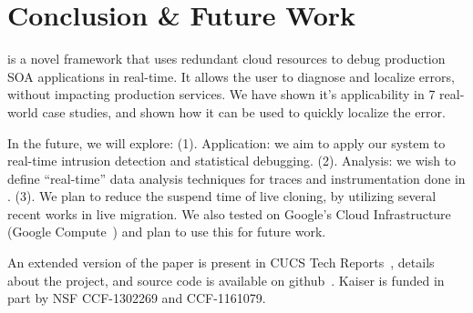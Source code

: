 
\vspace{-1mm}
\section{Conclusion \& Future Work}
\label{sec:conclusion}


\parikshan is a novel framework that uses redundant cloud resources to debug production SOA applications in real-time.
It allows the user to diagnose and localize errors, without impacting production services.
We have shown it's applicability in  7 real-world case studies, and shown how it can be used to quickly localize the error.

In the future, we will explore: (1). Application: we aim to apply our system to real-time intrusion detection and statistical debugging.
(2). Analysis: we wish to define ``real-time'' data analysis techniques for traces and instrumentation done in \parikshan.
(3). We plan to reduce the suspend time of live cloning, by utilizing several recent works in live migration.
We also tested \parikshan on Google's Cloud Infrastructure (Google Compute~\cite{gcompute}) and plan to use this for future work. 

An extended version of the paper is present in CUCS Tech Reports~\cite{parikshanTR,parikshanQueue}, details about the project, and source code is available on github~\cite{github}. 
Kaiser is funded in part by NSF CCF-1302269 and CCF-1161079.
